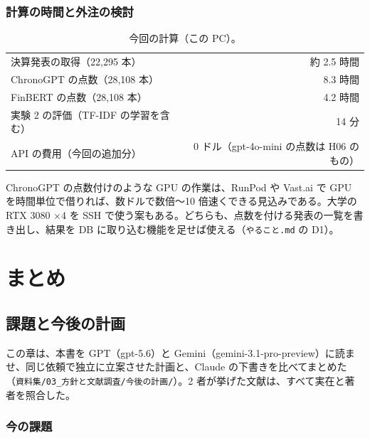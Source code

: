 \documentclass[xelatex,ja=standard,jafont=haranoaji,a4paper,10pt]{bxjsreport}
\newcommand{\code}[1]{\texttt{#1}}
\begin{document}
\section{計算の時間と外注の検討}

\begin{table}[H]
\centering
\caption{今回の計算（この PC）。}
\small
\begin{tabular}{lr}
\toprule
決算発表の取得（22,295 本） & 約 2.5 時間 \\
ChronoGPT の点数（28,108 本） & 8.3 時間 \\
FinBERT の点数（28,108 本） & 4.2 時間 \\
実験 2 の評価（TF-IDF の学習を含む） & 14 分 \\
API の費用（今回の追加分） & 0 ドル（gpt-4o-mini の点数は H06 のもの） \\
\bottomrule
\end{tabular}
\end{table}

ChronoGPT の点数付けのような GPU の作業は、RunPod や Vast.ai で GPU を時間単位で借りれば、数ドルで数倍〜10 倍速くできる見込みである。大学の RTX 3080 ×4 を SSH で使う案もある。どちらも、点数を付ける発表の一覧を書き出し、結果を DB に取り込む機能を足せば使える（\code{やること.md} の D1）。

\part{まとめ}

\chapter{課題と今後の計画}\label{ch:future}

この章は、本書を GPT（gpt-5.6）と Gemini（gemini-3.1-pro-preview）に読ませ、同じ依頼で独立に立案させた計画と、Claude の下書きを比べてまとめた（\code{資料集/03\_方針と文献調査/今後の計画/}）。2 者が挙げた文献は、すべて実在と著者を照合した。

\section{今の課題}
\end{document}
